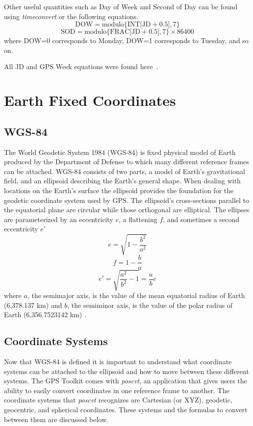 \begin{bibunit}
Other useful quantities such as Day of Week and  Second of Day can be found using \emph{timeconvert} or the following equations.
\[\mbox{DOW}=\mbox{modulo\{INT[JD}+0.5],7\}\]
\[\mbox{SOD}=\mbox{modulo\{FRAC[JD}+0.5],7\}\times 86400\]
where DOW=0 corresponds to Monday, DOW=1 corresponds to Tuesday, and so on.

All JD and GPS Week equations were found here~\cite[pp. 36-37]{hlc:gtp}.

\section{Earth Fixed Coordinates}
\subsection{WGS-84}
The World Geodetic System 1984 (WGS-84) is fixed physical model of Earth produced by the Department of Defense to which many different reference frames can be attached. WGS-84 consists of two parts, a model of Earth's gravitational field, and an ellipsoid describing the Earth's general shape. When dealing with locations on the Earth's surface the ellipsoid provides the foundation for the geodetic coordinate system used by GPS. The ellipsoid's cross-sections parallel to the equatorial plane are circular while those orthogonal are elliptical. The ellipses are parameterized by an eccentricity $e$, a flattening $f$, and sometimes a second eccentricity $e'$
\[e=\sqrt{1-\frac{b^{2}}{a^{2}}}\]
\[f=1-\frac{b}{a}\]
\[e'=\sqrt{\frac{a^{2}}{b^{2}}-1}=\frac{a}{b}e\]
where $a$, the semimajor axis, is the value of the mean equatorial radius of Earth (6,378.137 km) and $b$, the semiminor axis, is the value of the polar radius of Earth (6,356.7523142 km) \cite[pp. 25-26]{kaplan:ugpspa}.
\subsection{Coordinate Systems}
Now that WGS-84 is defined it is important to understand what coordinate systems can be attached to the ellipsoid and how to move between these different systems. The GPS Toolkit comes with \emph{poscvt}, an application that gives users the ability to easily convert coordinates in one reference frame to another. The coordinate 
systems that \emph{poscvt} recognizes are Cartesian (or XYZ), geodetic, geocentric, and spherical coordinates. These systems and the formulas to convert between them are discussed below.

\end{bibunit}
